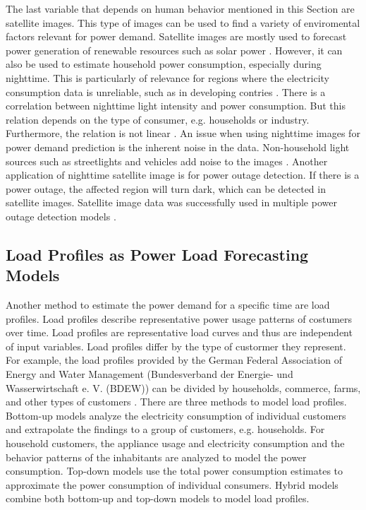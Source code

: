 The last variable that depends on human behavior mentioned in this Section are
satellite images. This type of images can be used to find a variety 
of enviromental factors relevant for power demand.
Satellite images are mostly used to forecast power generation of 
renewable resources such as solar power \cite{solarprediction}.
However, it can also be used to estimate household power consumption,
especially during nighttime. This is particularly of relevance for regions 
where the electricity consumption data is unreliable, such as in developing contries
\cite{reviewnighttime}. There is a correlation 
between nighttime light intensity and power consumption.
But this relation depends on the type of consumer, e.g. households or industry. 
Furthermore, the relation is not linear \cite{nighttimepowerestimation}. 
An issue when using nighttime images for power demand prediction is 
the inherent noise in the data. Non-household light sources such as 
streetlights and vehicles add noise to the images \cite{reviewnighttime}.
Another application of nighttime satellite image is for power outage detection.
If there is a power outage, the affected region will turn dark, which 
can be detected in satellite images. Satellite image data 
was successfully used in multiple power outage detection models
\cite{nightpoweroutage} \cite{twitterpoweroutagelighttime}.

\subsection{Load Profiles as Power Load Forecasting Models}
\label{loadprofilebasic}
Another method to estimate the power demand for a specific time are load 
profiles. Load profiles describe representative power usage patterns 
of costumers over time. Load profiles are 
representative load curves and thus are independent of input variables.
Load profiles differ by the type of custormer they represent. For 
example, the load profiles provided by the German Federal Association of 
Energy and Water Management (Bundesverband der Energie- und Wasserwirtschaft 
e. V. (BDEW)) can be divided by households, commerce, 
farms, and other types of customers \cite{meier1999reprasentative}.
There are three methods to model load profiles.
Bottom-up models analyze the electricity consumption of individual customers
and extrapolate the findings to a group of customers, e.g. households.
For household customers, the appliance usage and electricity consumption 
and the behavior patterns of the inhabitants are analyzed to model
the power consumption. Top-down models use the total power consumption 
estimates to approximate the power consumption of individual consumers.
Hybrid models combine both bottom-up and top-down models to model 
load profiles. 

